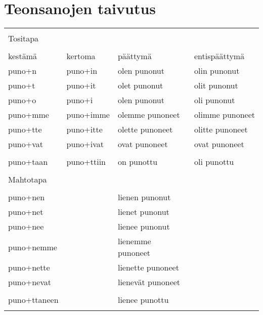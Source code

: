 \section{Teonsanojen taivutus}

\begin{tabular}{@{}|l|l|l|l|} \hline
              &            &                 & \\
Tositapa      &            &                 & \\
              &            &                 & \\ \hline
kestämä       & kertoma    & päättymä        & entispäättymä \\ \hline
puno+n        & puno+in    & olen punonut    & olin punonut \\
puno+t        & puno+it    & olet punonut    & olit punonut \\
puno+o        & puno+i     & olen punonut    & oli punonut \\
puno+mme      & puno+imme  & olemme punoneet & olimme punoneet \\
puno+tte      & puno+itte  & olette punoneet & olitte punoneet \\
puno+vat      & puno+ivat  & ovat punoneet   & ovat punoneet \\
              &            &                 & \\
puno+taan     & puno+ttiin & on punottu      & oli punottu \\ \hline
              &            &                 & \\
Mahtotapa     &            &                 & \\
              &            &                   & \\ \hline
puno+nen      &            & lienen punonut    & \\
puno+net      &            & lienet punonut    & \\
puno+nee      &            & lienee punonut    & \\
puno+nemme    &            & lienemme punoneet & \\
puno+nette    &            & lienette punoneet & \\
puno+nevat    &            & lienevät punoneet & \\ 
              &            &                   & \\
puno+ttaneen  &            & lienee punottu    & \\ \hline
              &            &                   & \\

\end{tabular}
